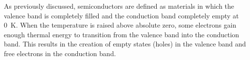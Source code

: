 As previously discussed, semiconductors are defined as materials in which the valence band is completely filled and the conduction band completely empty at 0~K. When the temperature is raised above absolute zero, some electrons gain enough thermal energy to transition from the valence band into the conduction band. This results in the creation of empty states (holes) in the valence band and free electrons in the conduction band.
